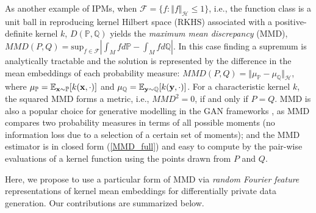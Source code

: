\documentclass{article}
\begin{document}
As another example of IPMs, when $\mathcal{F} = \{f: \Vert f \Vert_{\mathcal{H}} \leq 1 \}$, i.e., the function class is a unit ball in reproducing kernel Hilbert space (RKHS) associated with a positive-definite kernel $k$,  $D(\mathbb{P},\mathbb{Q})$ yields the \textit{maximum mean discrepancy} (MMD), 
$MMD(P,Q) =  \mbox{sup}_{f \in \mathcal{F}} \left| \int_{M} f d \mathbb{P} - \int_{M} f d\mathbb{Q} \right|$.
In this case finding a supremum is analytically tractable and the solution is represented by the difference in the mean embeddings of each probability measure: $MMD(P,Q) =  \Vert \mu_{\mathbb{P}} - \mu_{\mathbb{Q}} \Vert_{\mathcal{H}}$, where 
$ \mu_{\mathbb{P}}  = \mathbb{E}_{\mathbf{x} \sim \mathbb{P}}[k(\mathbf{x}, \cdot)]$ and
$ \mu_{\mathbb{Q}}  = \mathbb{E}_{\mathbf{y} \sim \mathbb{Q}}[k(\mathbf{y}, \cdot)]$. 
For a characteristic kernel $k$, the squared MMD forms a metric, i.e., $MMD^2  = 0$, if and only if $P=Q$. 
%
MMD is also a popular choice for generative modelling in the GAN frameworks \cite{GMMN, NIPS2017_6815}, as MMD compares two probability measures in terms of all possible moments (no information loss due to a selection of a certain set of moments); and the MMD estimator is in closed form (\eqref{MMD_full}) and easy to compute by the pair-wise evaluations of a kernel function using the points drawn from $P$ and $Q$.
 
Here, we propose to use a particular form of MMD via \textit{random Fourier feature} representations \cite{rahimi2008random} of kernel mean embeddings for differentially private data generation. Our contributions are summarized below. 
%
\end{document}
